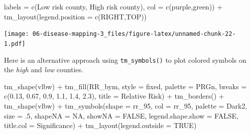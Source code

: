\documentclass[
]{book}
\newenvironment{Shaded}{\begin{snugshade}}{\end{snugshade}}
\newcommand{\AttributeTok}[1]{\textcolor[rgb]{0.77,0.63,0.00}{#1}}
\newcommand{\ConstantTok}[1]{\textcolor[rgb]{0.00,0.00,0.00}{#1}}
\newcommand{\DecValTok}[1]{\textcolor[rgb]{0.00,0.00,0.81}{#1}}
\newcommand{\FloatTok}[1]{\textcolor[rgb]{0.00,0.00,0.81}{#1}}
\newcommand{\FunctionTok}[1]{\textcolor[rgb]{0.00,0.00,0.00}{#1}}
\newcommand{\NormalTok}[1]{#1}
\newcommand{\SpecialCharTok}[1]{\textcolor[rgb]{0.00,0.00,0.00}{#1}}
\newcommand{\StringTok}[1]{\textcolor[rgb]{0.31,0.60,0.02}{#1}}
\begin{document}
\begin{Shaded}
\begin{Highlighting}[]
                \AttributeTok{labels =} \FunctionTok{c}\NormalTok{(}\StringTok{\textquotesingle{}Low risk county\textquotesingle{}}\NormalTok{, }\StringTok{\textquotesingle{}High risk county\textquotesingle{}}\NormalTok{), }
                \AttributeTok{col =} \FunctionTok{c}\NormalTok{(}\StringTok{\textquotesingle{}purple\textquotesingle{}}\NormalTok{,}\StringTok{\textquotesingle{}green\textquotesingle{}}\NormalTok{)) }\SpecialCharTok{+}
  \FunctionTok{tm\_layout}\NormalTok{(}\AttributeTok{legend.position =} \FunctionTok{c}\NormalTok{(}\StringTok{\textquotesingle{}RIGHT\textquotesingle{}}\NormalTok{,}\StringTok{\textquotesingle{}TOP\textquotesingle{}}\NormalTok{))}
\end{Highlighting}
\end{Shaded}

\texttt{[image: 06-disease-mapping-3\_files/figure-latex/unnamed-chunk-22-1.pdf]}

Here is an alternative approach using \texttt{tm\_symbols()} to plot colored symbols on the \emph{high} and \emph{low} counties.

\begin{Shaded}
\begin{Highlighting}[]
\FunctionTok{tm\_shape}\NormalTok{(vlbw) }\SpecialCharTok{+}
  \FunctionTok{tm\_fill}\NormalTok{(}\StringTok{\textquotesingle{}RR\_bym\textquotesingle{}}\NormalTok{,}
          \AttributeTok{style =} \StringTok{\textquotesingle{}fixed\textquotesingle{}}\NormalTok{,}
          \AttributeTok{palette =} \StringTok{\textquotesingle{}PRGn\textquotesingle{}}\NormalTok{,}
          \AttributeTok{breaks =} \FunctionTok{c}\NormalTok{(}\FloatTok{0.13}\NormalTok{, }\FloatTok{0.67}\NormalTok{, }\FloatTok{0.9}\NormalTok{, }\FloatTok{1.1}\NormalTok{, }\FloatTok{1.4}\NormalTok{, }\FloatTok{2.3}\NormalTok{),}
          \AttributeTok{title =} \StringTok{\textquotesingle{}Relative Risk\textquotesingle{}}\NormalTok{) }\SpecialCharTok{+}
  \FunctionTok{tm\_borders}\NormalTok{() }\SpecialCharTok{+} 
\FunctionTok{tm\_shape}\NormalTok{(vlbw) }\SpecialCharTok{+} 
  \FunctionTok{tm\_symbols}\NormalTok{(}\AttributeTok{shape =} \StringTok{\textquotesingle{}rr\_95\textquotesingle{}}\NormalTok{,}
             \AttributeTok{col =} \StringTok{\textquotesingle{}rr\_95\textquotesingle{}}\NormalTok{,}
             \AttributeTok{palette =} \StringTok{\textquotesingle{}Dark2\textquotesingle{}}\NormalTok{,}
             \AttributeTok{size =}\NormalTok{ .}\DecValTok{5}\NormalTok{,}
             \AttributeTok{shapeNA =} \ConstantTok{NA}\NormalTok{,}
             \AttributeTok{showNA =} \ConstantTok{FALSE}\NormalTok{,}
             \AttributeTok{legend.shape.show =} \ConstantTok{FALSE}\NormalTok{,}
            \AttributeTok{title.col =} \StringTok{\textquotesingle{}Significance\textquotesingle{}}\NormalTok{) }\SpecialCharTok{+}
  \FunctionTok{tm\_layout}\NormalTok{(}\AttributeTok{legend.outside =} \ConstantTok{TRUE}\NormalTok{)}
\end{Highlighting}
\end{Shaded}
\end{document}
